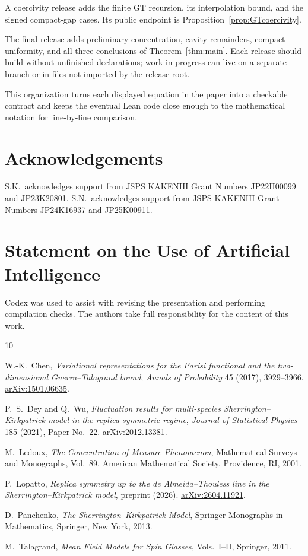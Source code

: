 \documentclass[11pt]{article}
\numberwithin{equation}{section}
\newcommand{\1}{\mathbf 1}
\begin{document}
A coercivity release adds the finite GT recursion, its interpolation bound,
and the signed compact-gap cases.  Its public endpoint is
Proposition~\ref{prop:GTcoercivity}.

The final release adds preliminary concentration, cavity remainders,
compact uniformity, and all three conclusions of Theorem~\ref{thm:main}.
Each release should build without unfinished declarations; work in progress
can live on a separate branch or in files not imported by the release root.

This organization turns each displayed equation in the paper into a
checkable contract and keeps the eventual Lean code close enough to the
mathematical notation for line-by-line comparison.


\section*{Acknowledgements}
S.K.\ acknowledges support from JSPS KAKENHI Grant Numbers
JP22H00099 and JP23K20801.
S.N.\ acknowledges support from JSPS KAKENHI Grant Numbers
JP24K16937 and JP25K00911.

\section*{Statement on the Use of Artificial Intelligence}
Codex was used to assist with revising the presentation and performing
compilation checks.  The authors take full responsibility for the
content of this work.

\begin{thebibliography}{10}

W.-K.~Chen,
\newblock
\emph{Variational representations for the Parisi functional and the
two-dimensional Guerra--Talagrand bound},
\newblock \emph{Annals of Probability} 45 (2017), 3929--3966.
\href{https://arxiv.org/abs/1501.06635}{arXiv:1501.06635}.

P.~S.~Dey and Q.~Wu,
\newblock
\emph{Fluctuation results for multi-species
Sherrington--Kirkpatrick model in the replica symmetric regime},
\newblock \emph{Journal of Statistical Physics} 185 (2021),
Paper No.~22.
\href{https://arxiv.org/abs/2012.13381}{arXiv:2012.13381}.

M.~Ledoux,
\newblock
\emph{The Concentration of Measure Phenomenon},
\newblock Mathematical Surveys and Monographs, Vol.~89,
American Mathematical Society, Providence, RI, 2001.

P.~Lopatto,
\newblock
\emph{Replica symmetry up to the de Almeida--Thouless line in the
Sherrington--Kirkpatrick model},
\newblock preprint (2026).
\href{https://arxiv.org/abs/2604.11921}{arXiv:2604.11921}.

D.~Panchenko,
\newblock
\emph{The Sherrington--Kirkpatrick Model},
\newblock Springer Monographs in Mathematics, Springer, New York, 2013.

M.~Talagrand,
\newblock
\emph{Mean Field Models for Spin Glasses}, Vols.~I--II,
\newblock Springer, 2011.

\end{thebibliography}
\end{document}
